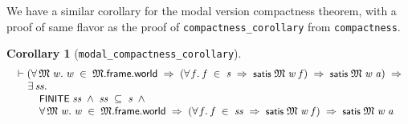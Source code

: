 \documentclass[letterpaper]{article}
\newtheorem{coro}{Corollary}
\renewcommand{\HOLConst}[1]{{\textsf{\upshape\small #1}}}
\newenvironment{holmath}{\begin{displaymath}\begin{array}{l}}{\end{array}\end{displaymath}\ignorespacesafterend}
\begin{document}
We have a similar corollary for the modal version compactness theorem, with a proof of same flavor as the proof of \texttt{compactness_corollary} from \texttt{compactness}.
\begin{coro}[\texttt{modal_compactness_corollary}]
\begin{holmath}
  \ensuremath{\HOLTokenTurnstile}(\HOLSymConst{\HOLTokenForall{}}\HOLBoundVar{\ensuremath{\mathfrak{M}}}\;\HOLBoundVar{w}.\;\HOLBoundVar{w}\;\HOLSymConst{\HOLTokenIn{}}\;\HOLBoundVar{\ensuremath{\mathfrak{M}}}.\HOLFieldName{frame}.\HOLFieldName{world}\;\HOLSymConst{\HOLTokenImp{}}\;(\HOLSymConst{\HOLTokenForall{}}\HOLBoundVar{f}.\;\HOLBoundVar{f}\;\HOLSymConst{\HOLTokenIn{}}\;\HOLFreeVar{s}\;\HOLSymConst{\HOLTokenImp{}}\;\HOLConst{satis}\;\HOLBoundVar{\ensuremath{\mathfrak{M}}}\;\HOLBoundVar{w}\;\HOLBoundVar{f})\;\HOLSymConst{\HOLTokenImp{}}\;\HOLConst{satis}\;\HOLBoundVar{\ensuremath{\mathfrak{M}}}\;\HOLBoundVar{w}\;\HOLFreeVar{a})\;\HOLSymConst{\HOLTokenImp{}}\\
\;\;\;\;\;\HOLSymConst{\HOLTokenExists{}}\HOLBoundVar{ss}.\\
\;\;\;\;\;\;\;\;\;\HOLConst{FINITE}\;\HOLBoundVar{ss}\;\HOLSymConst{\HOLTokenConj{}}\;\HOLBoundVar{ss}\;\HOLSymConst{\HOLTokenSubset{}}\;\HOLFreeVar{s}\;\HOLSymConst{\HOLTokenConj{}}\\
\;\;\;\;\;\;\;\;\;\HOLSymConst{\HOLTokenForall{}}\HOLBoundVar{\ensuremath{\mathfrak{M}}}\;\HOLBoundVar{w}.\;\HOLBoundVar{w}\;\HOLSymConst{\HOLTokenIn{}}\;\HOLBoundVar{\ensuremath{\mathfrak{M}}}.\HOLFieldName{frame}.\HOLFieldName{world}\;\HOLSymConst{\HOLTokenImp{}}\;(\HOLSymConst{\HOLTokenForall{}}\HOLBoundVar{f}.\;\HOLBoundVar{f}\;\HOLSymConst{\HOLTokenIn{}}\;\HOLBoundVar{ss}\;\HOLSymConst{\HOLTokenImp{}}\;\HOLConst{satis}\;\HOLBoundVar{\ensuremath{\mathfrak{M}}}\;\HOLBoundVar{w}\;\HOLBoundVar{f})\;\HOLSymConst{\HOLTokenImp{}}\;\HOLConst{satis}\;\HOLBoundVar{\ensuremath{\mathfrak{M}}}\;\HOLBoundVar{w}\;\HOLFreeVar{a}
\end{holmath}
\end{coro}
\end{document}

